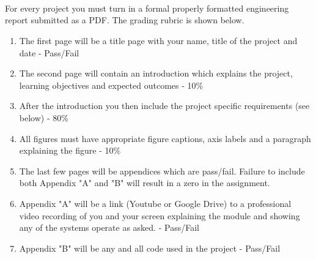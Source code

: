 \ \\
\ \\
\ \\
\noindent For every project you must turn in a formal properly formatted engineering report submitted as a PDF. The grading rubric is shown below.

\begin{enumerate}[itemsep=-5pt]
\item The first page will be a title page with your name, title of the project and date - Pass/Fail 	
\item The second page will contain an introduction which explains the project, learning objectives and expected outcomes - 10\%
\item After the introduction you then include the project specific requirements (see below) - 80\%
\item All figures must have appropriate figure captions, axis labels and a paragraph explaining the figure - 10\%
\item The last few pages will be appendices which are pass/fail. Failure to include both Appendix "A" and "B" will result in a zero in the assignment.
\item Appendix "A" will be a link (Youtube or Google Drive) to a professional video recording of you and your screen explaining the module and showing any of the systems operate as asked. - Pass/Fail
\item Appendix "B" will be any and all code used in the project - Pass/Fail
\end{enumerate}

